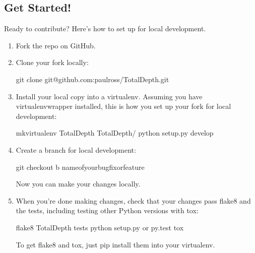 \documentclass[letterpaper,10pt,english]{sphinxmanual}
\begin{document}
\subsection{Get Started!}
\label{\detokenize{contributing:get-started}}
Ready to contribute? Here’s how to set up  for local development.
\begin{enumerate}
\item {} 
Fork the  repo on GitHub.

\item {} 
Clone your fork locally:

\begin{sphinxVerbatim}[commandchars=\\\{\}]
\PYGZdl{} git clone git@github.com:paulross/TotalDepth.git
\end{sphinxVerbatim}

\item {} 
Install your local copy into a virtualenv. Assuming you have virtualenvwrapper installed, this is how you set up your fork for local development:

\begin{sphinxVerbatim}[commandchars=\\\{\}]
\PYGZdl{} mkvirtualenv TotalDepth
\PYGZdl{}  TotalDepth/
\PYGZdl{} python setup.py develop
\end{sphinxVerbatim}

\item {} 
Create a branch for local development:

\begin{sphinxVerbatim}[commandchars=\\\{\}]
\PYGZdl{} git checkout \PYGZhy{}b name\PYGZhy{}of\PYGZhy{}your\PYGZhy{}bugfix\PYGZhy{}or\PYGZhy{}feature
\end{sphinxVerbatim}

Now you can make your changes locally.

\item {} 
When you’re done making changes, check that your changes pass flake8 and the tests, including testing other Python versions with tox:

\begin{sphinxVerbatim}[commandchars=\\\{\}]
\PYGZdl{} flake8 TotalDepth tests
\PYGZdl{} python setup.py  or py.test
\PYGZdl{} tox
\end{sphinxVerbatim}

To get flake8 and tox, just pip install them into your virtualenv.


\end{enumerate}
\end{document}
